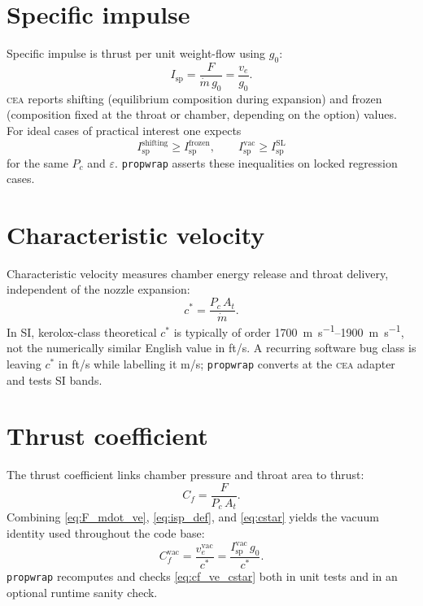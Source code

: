 \documentclass[11pt,a4paper]{report}
\newcommand{\pw}{\texttt{propwrap}}
\newcommand{\cea}{\textsc{cea}}
\newcommand{\Isp}{I_{\mathrm{sp}}}
\newcommand{\cstar}{c^{*}}
\newcommand{\Cf}{C_{f}}
\newcommand{\ve}{v_{e}}
\newcommand{\Pc}{P_{c}}
\newcommand{\eps}{\varepsilon}
\newcommand{\gzero}{g_{0}}
\begin{document}
\section{Specific impulse}

Specific impulse is thrust per unit weight-flow using $\gzero$:
\begin{equation}
  \Isp = \frac{F}{\dot{m}\,\gzero} = \frac{\ve}{\gzero}.
  \label{eq:isp_def}
\end{equation}
\cea{} reports shifting (equilibrium composition during expansion) and frozen
(composition fixed at the throat or chamber, depending on the option) values.
For ideal cases of practical interest one expects
\begin{equation}
  \Isp^{\mathrm{shifting}} \ge \Isp^{\mathrm{frozen}},
  \qquad
  \Isp^{\mathrm{vac}} \ge \Isp^{\mathrm{SL}}
  \label{eq:isp_order}
\end{equation}
for the same $\Pc$ and $\eps$. \pw{} asserts these inequalities on locked
regression cases.

\section{Characteristic velocity}

Characteristic velocity measures chamber energy release and throat delivery,
independent of the nozzle expansion:
\begin{equation}
  \cstar = \frac{\Pc\,A_t}{\dot{m}}.
  \label{eq:cstar}
\end{equation}
In SI, kerolox-class theoretical $\cstar$ is typically of order
\SIrange{1700}{1900}{\metre\per\second}, not the numerically similar English
value in ft/s. A recurring software bug class is leaving $\cstar$ in ft/s while
labelling it m/s; \pw{} converts at the \cea{} adapter and tests SI bands.

\section{Thrust coefficient}

The thrust coefficient links chamber pressure and throat area to thrust:
\begin{equation}
  \Cf = \frac{F}{\Pc\,A_t}.
  \label{eq:cf_def}
\end{equation}
Combining \eqref{eq:F_mdot_ve}, \eqref{eq:isp_def}, and \eqref{eq:cstar} yields
the vacuum identity used throughout the code base:
\begin{equation}
  \boxed{\Cf^{\mathrm{vac}} = \frac{\ve^{\mathrm{vac}}}{\cstar} = \frac{\Isp^{\mathrm{vac}}\,\gzero}{\cstar}.}
  \label{eq:cf_ve_cstar}
\end{equation}
\pw{} recomputes and checks \eqref{eq:cf_ve_cstar} both in unit tests and in an
optional runtime sanity check.
\end{document}
